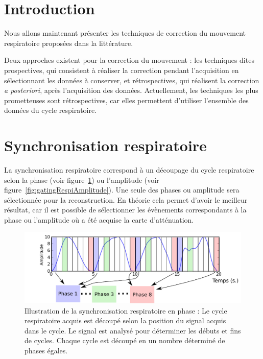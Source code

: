 \label{lab:corrMvt}

\section{Introduction}

Nous allons maintenant présenter les techniques de correction du mouvement respiratoire proposées dans la littérature. 

Deux approches existent pour la correction du mouvement : les techniques dites prospectives, qui consistent à réaliser la correction pendant l'acquisition en sélectionnant les données à conserver, et rétrospectives, qui réalisent la correction \textit{a posteriori}, après l'acquisition des données. Actuellement, les techniques les plus prometteuses sont rétrospectives, car elles permettent d'utiliser l'ensemble des données du cycle respiratoire.

\section{Synchronisation respiratoire}

La synchronisation respiratoire correspond à un découpage du cycle respiratoire selon la phase (voir figure~\ref{fig:gatingRespi}) ou l'amplitude (voir figure~\ref{fig:gatingRespiAmplitude}). Une seule des phases ou amplitude sera sélectionnée pour la reconstruction. En théorie cela permet d'avoir le meilleur résultat, car il est possible de sélectionner les évènements correspondants à la phase ou l'amplitude où a été acquise la carte d'atténuation.


\begin{figure}[h!]
	\begin{center}
		\includegraphics[width=14cm]{images/ET-IM}
	\end{center}
	\caption[Illustration de la synchronisation respiratoire en phase]{Illustration de la synchronisation respiratoire en phase : Le cycle respiratoire acquis est découpé selon la position du signal acquis dans le cycle. Le signal est analysé pour déterminer les débuts et fins de cycles. Chaque cycle est découpé en un nombre déterminé de phases égales.} 
	\label{fig:gatingRespi}
\end{figure}


